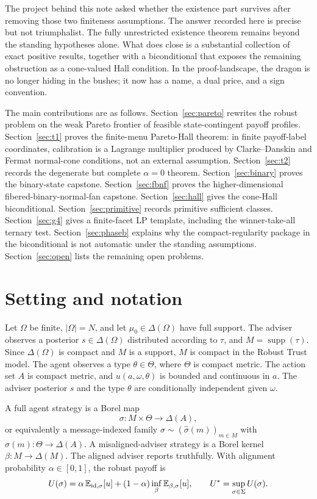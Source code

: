 \documentclass[11pt]{article}
\theoremstyle{definition}
\theoremstyle{remark}
\newcommand{\Om}{\Omega}
\newcommand{\Th}{\Theta}
\newcommand{\Si}{\Sigma}
\newcommand{\suppset}{\operatorname{supp}}
\newcommand{\E}{\mathbb{E}}
\begin{document}
The project behind this note asked whether the existence part survives after removing those two finiteness assumptions. The answer recorded here is precise but not triumphalist. The fully unrestricted existence theorem remains beyond the standing hypotheses alone. What does close is a substantial collection of exact positive results, together with a biconditional that exposes the remaining obstruction as a cone-valued Hall condition. In the proof-landscape, the dragon is no longer hiding in the bushes; it now has a name, a dual price, and a sign convention.

The main contributions are as follows. Section~\ref{sec:pareto} rewrites the robust problem on the weak Pareto frontier of feasible state-contingent payoff profiles. Section~\ref{sec:t1} proves the finite-menu Pareto-Hall theorem: in finite payoff-label coordinates, calibration is a Lagrange multiplier produced by Clarke--Danskin and Fermat normal-cone conditions, not an external assumption. Section~\ref{sec:t2} records the degenerate but complete $\alpha=0$ theorem. Section~\ref{sec:binary} proves the binary-state capstone. Section~\ref{sec:fbnf} proves the higher-dimensional fibered-binary-normal-fan capstone. Section~\ref{sec:hall} gives the cone-Hall biconditional. Section~\ref{sec:primitive} records primitive sufficient classes. Section~\ref{sec:g4} gives a finite-facet LP template, including the winner-take-all ternary test. Section~\ref{sec:phaseb} explains why the compact-regularity package in the biconditional is not automatic under the standing assumptions. Section~\ref{sec:open} lists the remaining open problems.

\section{Setting and notation}\label{sec:setting}

Let $\Om$ be finite, $|\Om|=N$, and let $\mu_0\in\Delta(\Om)$ have full support. The adviser observes a posterior $s\in\Delta(\Om)$ distributed according to $\tau$, and $M=\suppset(\tau)$. Since $\Delta(\Om)$ is compact and $M$ is a support, $M$ is compact in the Robust Trust model. The agent observes a type $\theta\in\Th$, where $\Th$ is compact metric. The action set $A$ is compact metric, and $u(a,\omega,\theta)$ is bounded and continuous in $a$. The adviser posterior $s$ and the type $\theta$ are conditionally independent given $\omega$.

A full agent strategy is a Borel map
\[
  \sigma:M\times\Th\to\Delta(A),
\]
or equivalently a message-indexed family $\sigma\sim(\hat\sigma(m))_{m\in M}$ with $\hat\sigma(m):\Th\to\Delta(A)$. A misaligned-adviser strategy is a Borel kernel $\beta:M\to\Delta(M)$. The aligned adviser reports truthfully. With alignment probability $\alpha\in[0,1]$, the robust payoff is
\begin{equation}\label{eq:robustpayoff}
  U(\sigma)
  = \alpha\,\E_{{\rm id},\sigma}[u]
    +(1-\alpha)\inf_{\beta}\E_{\beta,\sigma}[u],
  \qquad
  U^* = \sup_{\sigma\in\Si}U(\sigma).
\end{equation}
\end{document}
